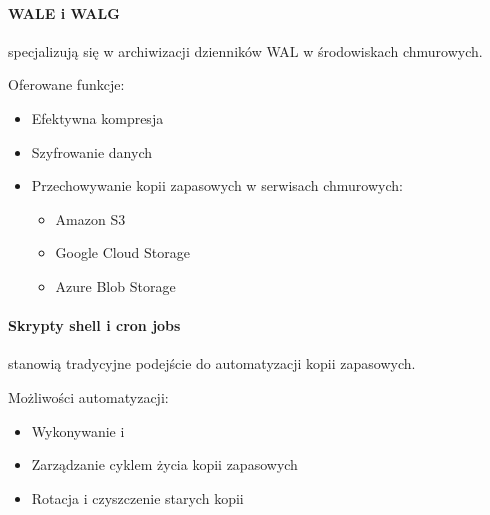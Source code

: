 \documentclass[letterpaper,10pt,polish]{sphinxmanual}
\begin{document}
\paragraph{WAL\sphinxhyphen{}E i WAL\sphinxhyphen{}G}
\label{\detokenize{rozdzial2/Kopie_zapasowe_i_odzyskiwanie_danych/kopie_zapasowe_i_odzyskiwanie_danych:wal-e-i-wal-g}}
\sphinxAtStartPar
{} specjalizują się w archiwizacji dzienników WAL w środowiskach chmurowych.

\sphinxAtStartPar
Oferowane funkcje:
\begin{itemize}
\item {} 
\sphinxAtStartPar
Efektywna kompresja

\item {} 
\sphinxAtStartPar
Szyfrowanie danych

\item {} 
\sphinxAtStartPar
Przechowywanie kopii zapasowych w serwisach chmurowych:
\begin{itemize}
\item {} 
\sphinxAtStartPar
Amazon S3

\item {} 
\sphinxAtStartPar
Google Cloud Storage

\item {} 
\sphinxAtStartPar
Azure Blob Storage

\end{itemize}

\end{itemize}


\paragraph{Skrypty shell i cron jobs}
\label{\detokenize{rozdzial2/Kopie_zapasowe_i_odzyskiwanie_danych/kopie_zapasowe_i_odzyskiwanie_danych:skrypty-shell-i-cron-jobs}}
\sphinxAtStartPar
{} stanowią tradycyjne podejście do automatyzacji kopii zapasowych.

\sphinxAtStartPar
Możliwości automatyzacji:
\begin{itemize}
\item {} 
\sphinxAtStartPar
Wykonywanie  i 

\item {} 
\sphinxAtStartPar
Zarządzanie cyklem życia kopii zapasowych

\item {} 
\sphinxAtStartPar
Rotacja i czyszczenie starych kopii

\end{itemize}
\end{document}

